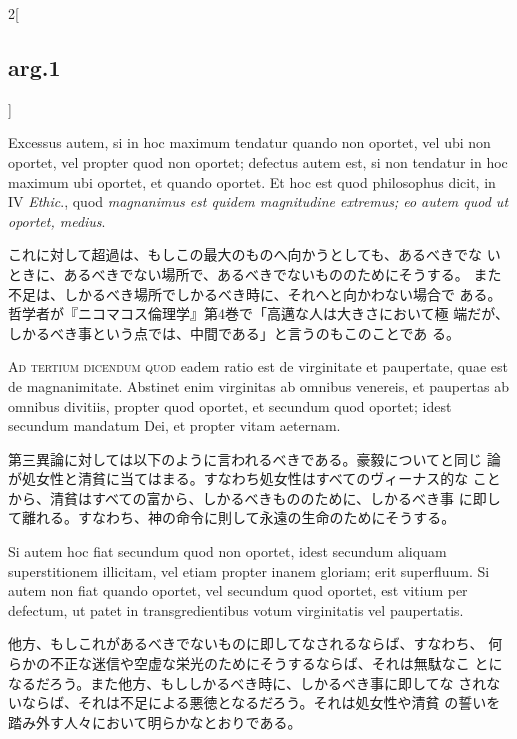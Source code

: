 \documentclass[paper=a4paper,fontsize=10pt,jafontsize=9pt,titlepage]{jlreq}
\begin{document}
\begin{paracol}{2}[\subsection{arg.1}]
\switchcolumn*

Excessus autem, si in hoc maximum tendatur quando non oportet, vel
ubi non oportet, vel propter quod non oportet; defectus autem est, si
non tendatur in hoc maximum ubi oportet, et quando oportet. Et hoc est
quod philosophus dicit, in IV {\itshape Ethic}., quod {\itshape
magnanimus est quidem magnitudine extremus; eo autem quod ut oportet,
medius}.

\switchcolumn

これに対して超過は、もしこの最大のものへ向かうとしても、あるべきでな
 いときに、あるべきでない場所で、あるべきでないもののためにそうする。
 また不足は、しかるべき場所でしかるべき時に、それへと向かわない場合で
 ある。哲学者が『ニコマコス倫理学』第4巻で「高邁な人は大きさにおいて極
 端だが、しかるべき事という点では、中間である」と言うのもこのことであ
 る。

\switchcolumn*[\subsection{ad.3}]

{\scshape Ad tertium dicendum quod} eadem ratio est de virginitate et
 paupertate, quae est de magnanimitate. Abstinet enim virginitas ab
 omnibus venereis, et paupertas ab omnibus divitiis, propter quod
 oportet, et secundum quod oportet; idest secundum mandatum Dei, et
 propter vitam aeternam.

\switchcolumn

第三異論に対しては以下のように言われるべきである。豪毅についてと同じ
 論が処女性と清貧に当てはまる。すなわち処女性はすべてのヴィーナス的な
 ことから、清貧はすべての富から、しかるべきもののために、しかるべき事
 に即して離れる。すなわち、神の命令に則して永遠の生命のためにそうする。

\switchcolumn*

Si autem hoc fiat secundum quod non oportet, idest secundum aliquam
 superstitionem illicitam, vel etiam propter inanem gloriam; erit
 superfluum. Si autem non fiat quando oportet, vel secundum quod
 oportet, est vitium per defectum, ut patet in transgredientibus votum
 virginitatis vel paupertatis.

\switchcolumn

他方、もしこれがあるべきでないものに即してなされるならば、すなわち、
 何らかの不正な迷信や空虚な栄光のためにそうするならば、それは無駄なこ
 とになるだろう。また他方、もししかるべき時に、しかるべき事に即してな
 されないならば、それは不足による悪徳となるだろう。それは処女性や清貧
 の誓いを踏み外す人々において明らかなとおりである。

\end{paracol}
\end{document}
